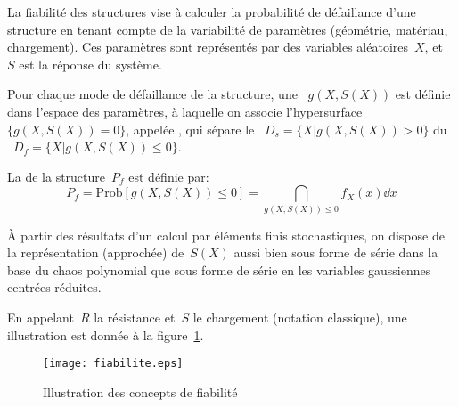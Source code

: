 La fiabilité des structures vise à calculer la probabilité de défaillance d'une structure en tenant compte de la variabilité de paramètres (géométrie, matériau,
chargement). Ces paramètres sont représentés par des variables aléatoires~$X$, et~$S$ est la réponse du système.

Pour chaque mode de défaillance de la structure, une ~$g(X,S(X))$ est définie dans l'espace des paramètres, à laquelle on associe l'hypersurface~$\{g(X,S(X)) = 0\}$, appelée , qui sépare le ~$D_s = \{X|g(X,S(X))>0\}$ du ~$D_f =\{X|g(X,S(X))\le0\}$.

La  de la structure~$P_f$ est définie par:
\begin{equation}
P_f = \text{Prob}[g(X,S(X))\le0] = \dint_{g(X,S(X))\le0} f_X(x)\dd x
\end{equation}

\medskip
À partir des résultats d'un calcul par éléments finis stochastiques, on dispose de la représentation (approchée) de~$S(X)$ aussi bien sous forme de série dans la base du chaos polynomial que sous forme de série en les variables gaussiennes centrées réduites.

\medskip
En appelant~$R$ la résistance et~$S$ le chargement (notation classique), une illustration est donnée à la figure~\ref{Fig-StoFiab}.
\begin{figure}[htb]
\begin{center}
\texttt{[image: fiabilite.eps]}
\end{center}
\caption{Illustration des concepts de fiabilité}\label{Fig-StoFiab}
\end{figure}

